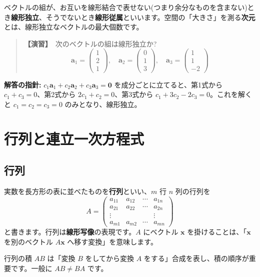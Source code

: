 \documentclass{article}
\begin{document}
ベクトルの組が、お互いを線形結合で表せない(つまり余分なものを含まない)とき\textbf{線形独立}、そうでないとき\textbf{線形従属}といいます。空間の「大きさ」を測る\textbf{次元}とは、線形独立なベクトルの最大個数です。

\begin{quote}
\textbf{【演習】}\ 次のベクトルの組は線形独立か?
\[ \boldsymbol{a}_1 = \begin{pmatrix} 1 \\ 2 \\ 1 \end{pmatrix}, \quad \boldsymbol{a}_2 = \begin{pmatrix} 0 \\ 1 \\ 3 \end{pmatrix}, \quad \boldsymbol{a}_3 = \begin{pmatrix} 1 \\ 1 \\ -2 \end{pmatrix} \]
\end{quote}

\textbf{解答の指針:} \(c_1 \boldsymbol{a}_1 + c_2 \boldsymbol{a}_2 + c_3 \boldsymbol{a}_3 = \boldsymbol{0}\) を成分ごとに立てると、第1式から \(c_1 + c_3 = 0\)、第2式から \(2c_1 + c_2 = 0\)、第3式から \(c_1 + 3c_2 - 2c_3 = 0\)。これを解くと \(c_1 = c_2 = c_3 = 0\) のみとなり、線形独立。

\section{行列と連立一次方程式}

\subsection{行列}

実数を長方形の表に並べたものを\textbf{行列}といい、\(m\) 行 \(n\) 列の行列を
\[ A = \begin{pmatrix} a_{11} & a_{12} & \cdots & a_{1n} \\ a_{21} & a_{22} & \cdots & a_{2n} \\ \vdots & & & \vdots \\ a_{m1} & a_{m2} & \cdots & a_{mn} \end{pmatrix} \]
と書きます。行列は\textbf{線形写像}の表現です。\(A\) にベクトル \(\boldsymbol{x}\) を掛けることは、「\(\boldsymbol{x}\) を別のベクトル \(A\boldsymbol{x}\) へ移す変換」を意味します。

行列の積 \(AB\) は「変換 \(B\) をしてから変換 \(A\) をする」合成を表し、積の順序が重要です。一般に \(AB \neq BA\) です。
\end{document}

